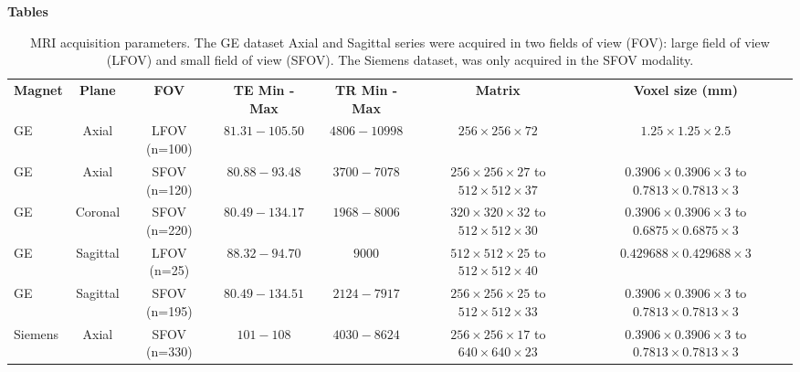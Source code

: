 \newpage
\textbf{Tables}
\begin{table}[ht]
    \caption{MRI acquisition parameters. The GE dataset Axial and Sagittal series were acquired in two fields of view (FOV): large field of view (LFOV) and small field of view (SFOV). The Siemens dataset, was only acquired in the SFOV modality.}
    \begin{tabular}{lcccccc}
         \hline
          \textbf{Magnet} & \textbf{Plane} & \textbf{FOV} & \textbf{TE Min - Max} & \textbf{TR Min - Max} & \textbf{Matrix} & \textbf{Voxel size (mm)} \\
          GE & Axial & LFOV (n=100) & $81.31 - 105.50$ & $4806 - 10998$ & $256 \times 256 \times 72$ & $1.25 \times 1.25 \times 2.5$ \\
          GE & Axial & SFOV (n=120) & $80.88 - 93.48$ & $3700 -7078$ &
                \shortstack{ $256 \times 256 \times 27$ to\\ $512 \times 512 \times 37$} & 
                \shortstack{ $0.3906 \times 0.3906 \times 3$ to\\ $0.7813 \times 0.7813 \times 3$} \\
          GE & Coronal & SFOV (n=220) & $80.49 - 134.17$ & $1968 - 8006$ &  
                \shortstack{$320 \times 320 \times 32$ to \\  $512 \times 512 \times 30$} & 
                \shortstack{$0.3906 \times 0.3906 \times 3$ to \\ $0.6875 \times 0.6875 \times 3$}\\
          GE & Sagittal & LFOV (n=25) & $88.32 - 94.70$ & $9000$ & 
                \shortstack{$512 \times 512 \times 25$ to \\  $512 \times 512 \times 40$} & 
                $0.429688 \times 0.429688 \times 3$\\
          GE & Sagittal & SFOV (n=195) & $80.49 - 134.51$ & $2124 - 7917$&  
                \shortstack{ $256 \times 256 \times 25$ to \\ $512 \times 512 \times 33$} &
                \shortstack{$0.3906 \times 0.3906 \times 3$ to \\ $0.7813 \times 0.7813 \times 3$}\\
          Siemens & Axial & SFOV (n=330)  & $101 - 108$ & $4030 - 8624$&  
                \shortstack{$256  \times 256 \times 17$ to \\ $640 \times 640 \times 23$} & 
                \shortstack{$0.3906 \times 0.3906 \times 3$ to\\ $0.7813 \times 0.7813 \times 3$} \\

\end{tabular}
\end{table}

